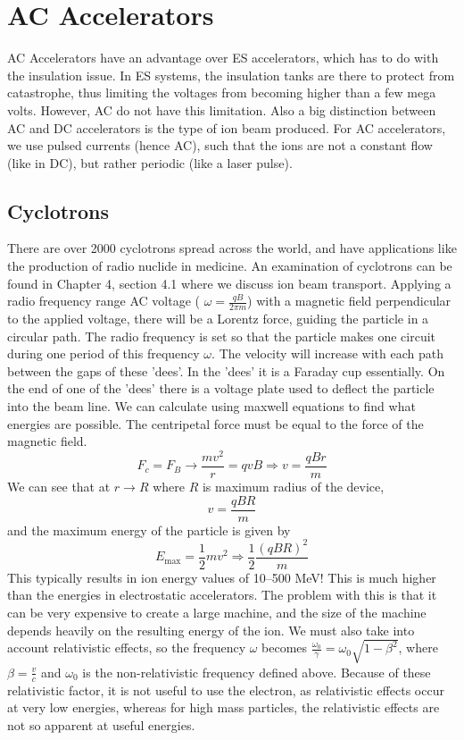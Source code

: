 \section{AC Accelerators}\label{sec:ac-accelerators}
AC Accelerators have an advantage over ES accelerators, which has to do with the insulation issue.
In ES systems, the insulation tanks are there to protect from catastrophe, thus limiting the voltages from becoming higher than a few mega volts.
However, AC do not have this limitation.
Also a big distinction between AC and DC accelerators is the type of ion beam produced.
For AC accelerators, we use pulsed currents (hence AC), such that the ions are not a constant flow (like in DC), but rather periodic (like a laser pulse).

\subsection{Cyclotrons}\label{subsec:cyclotrons}

There are over 2000 cyclotrons spread across the world, and have applications like the production of radio nuclide in medicine.
An examination of cyclotrons can be found in Chapter 4, section 4.1 where we discuss ion beam transport.
Applying a radio frequency range AC voltage ( $\omega = \frac{qB}{2\pi m}$) with a magnetic field perpendicular to the applied voltage, there will be a Lorentz force, guiding the particle in a circular path.
The radio frequency is set so that the particle makes one circuit during one period of this frequency $\omega$.
The velocity will increase with each path between the gaps of these 'dees'.
In the 'dees' it is a Faraday cup essentially.
On the end of one of the 'dees' there is a voltage plate used to deflect the particle into the beam line.
We can calculate using maxwell equations to find what energies are possible.
The centripetal force must be equal to the force of the magnetic field. $$ F_c = F_B \rightarrow \frac{mv^2}{r} = qvB \Rightarrow v = \frac{qBr}{m}$$
We can see that at $r \rightarrow R$ where $R$ is maximum radius of the device,\[ v = \frac{qBR}{m}\] and the maximum energy of the particle is given by
\[E_{\max} = \frac{1}{2} mv^2 \Rightarrow \frac{1}{2} \frac{(qBR)^2}{m} \]
This typically results in ion energy values of 10--500 MeV! This is much higher than the energies in electrostatic accelerators.
The problem with this is that it can be very expensive to create a large machine, and the size of the machine depends heavily on the resulting energy of the ion.
We must also take into account relativistic effects, so the frequency $\omega$ becomes $\frac{\omega_0}{\gamma} = \omega_0 \sqrt{1 - \beta^2} $, where $\beta = \frac{v}{c}$ and $\omega_0$ is the non-relativistic frequency defined above.
Because of these relativistic factor, it is not useful to use the electron, as relativistic effects occur at very low energies, whereas for high mass particles, the relativistic effects are not so apparent at useful energies.

